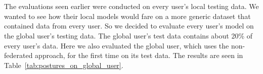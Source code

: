 \documentclass[12pt]{article}
\begin{document}
\\\\
The evaluations seen earlier were conducted on every user's local testing data. We wanted to see how their local models would fare on a more generic dataset that contained data from every user. So we decided to evaluate every user's model on the global user's testing data. The global user's test data contains about 20\% of every user's data. Here we also evaluated the global user, which uses the non-federated approach, for the first time on its test data. The results are seen in Table~\ref{tab:postures_on_global_user}.
\begin{table}[H]
\def\arraystretch{1.2}%
\end{table}
\end{document}
